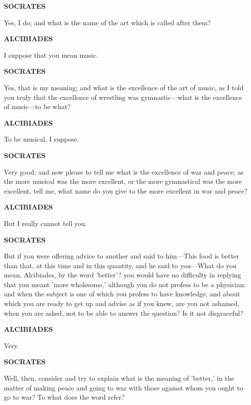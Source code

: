 \documentclass[11pt,letter]{article}
\begin{document}
\par \textbf{SOCRATES}
\par   Yes, I do; and what is the name of the art which is called after them?

\par \textbf{ALCIBIADES}
\par   I suppose that you mean music.

\par \textbf{SOCRATES}
\par   Yes, that is my meaning; and what is the excellence of the art of music, as I told you truly that the excellence of wrestling was gymnastic—what is the excellence of music—to be what?

\par \textbf{ALCIBIADES}
\par   To be musical, I suppose.

\par \textbf{SOCRATES}
\par   Very good; and now please to tell me what is the excellence of war and peace; as the more musical was the more excellent, or the more gymnastical was the more excellent, tell me, what name do you give to the more excellent in war and peace?

\par \textbf{ALCIBIADES}
\par   But I really cannot tell you.

\par \textbf{SOCRATES}
\par   But if you were offering advice to another and said to him—This food is better than that, at this time and in this quantity, and he said to you—What do you mean, Alcibiades, by the word 'better'? you would have no difficulty in replying that you meant 'more wholesome,' although you do not profess to be a physician:  and when the subject is one of which you profess to have knowledge, and about which you are ready to get up and advise as if you knew, are you not ashamed, when you are asked, not to be able to answer the question? Is it not disgraceful?

\par \textbf{ALCIBIADES}
\par   Very.

\par \textbf{SOCRATES}
\par   Well, then, consider and try to explain what is the meaning of 'better,' in the matter of making peace and going to war with those against whom you ought to go to war? To what does the word refer?
\end{document}
